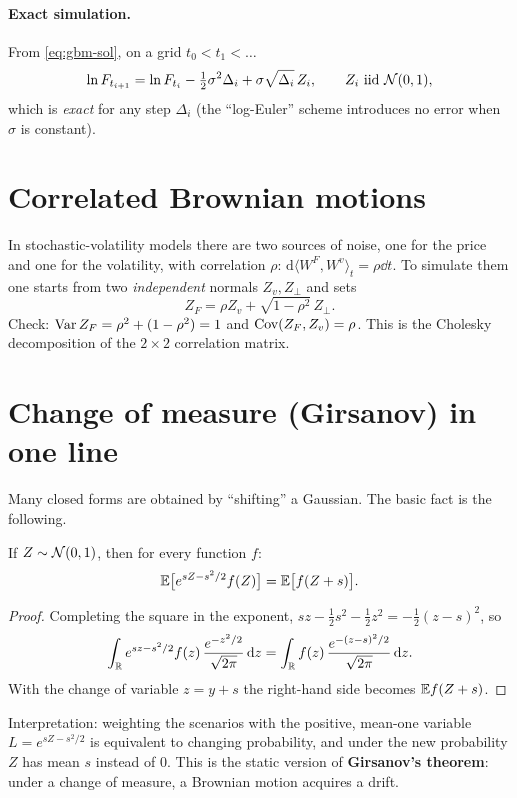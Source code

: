 \paragraph{Exact simulation.} From \eqref{eq:gbm-sol}, on a grid $t_0<t_1<\dots$
\begin{equation}\label{eq:log-euler}
\ln F_{t_{i+1}}=\ln F_{t_i}-\tfrac12\sigma^2\Delta_i+\sigma\sqrt{\Delta_i}\,Z_i,\qquad Z_i\ \text{iid }\N(0,1),
\end{equation}
which is \emph{exact} for any step $\Delta_i$ (the ``log-Euler'' scheme introduces no error when $\sigma$ is
constant).

\section{Correlated Brownian motions}
In stochastic-volatility models there are two sources of noise, one for the price and one for the volatility, with
correlation $\rho$: $\mathrm{d}\langle W^F,W^v\rangle_t=\rho\dd t$. To simulate them one starts from two
\emph{independent} normals $Z_v,Z_\perp$ and sets
\begin{equation}\label{eq:cholesky}
Z_F=\rho Z_v+\sqrt{1-\rho^2}\,Z_\perp .
\end{equation}
Check: $\operatorname{Var} Z_F=\rho^2+(1-\rho^2)=1$ and $\operatorname{Cov}(Z_F,Z_v)=\rho$. This is the Cholesky decomposition of the $2\times2$
correlation matrix.

\section{Change of measure (Girsanov) in one line}
Many closed forms are obtained by ``shifting'' a Gaussian. The basic fact is the following.

\begin{proposizione}\label{prop:tilt}
If $Z\sim\mathcal{N}(0,1)$, then for every function $f$:
\begin{equation}\label{eq:tilt}
\mathbb{E}\big[e^{sZ-s^2/2}f(Z)\big]=\mathbb{E}\big[f(Z+s)\big].
\end{equation}
\end{proposizione}

\begin{proof}
Completing the square in the exponent, $sz-\tfrac12s^2-\tfrac12z^2=-\tfrac12(z-s)^2$, so
\[
\int_{\mathbb{R}} e^{sz-s^2/2}f(z)\,\frac{e^{-z^2/2}}{\sqrt{2\pi}}\mathop{}\!\mathrm{d} z
=\int_{\mathbb{R}} f(z)\,\frac{e^{-(z-s)^2/2}}{\sqrt{2\pi}}\mathop{}\!\mathrm{d} z .
\]
With the change of variable $z=y+s$ the right-hand side becomes $\mathbb{E} f(Z+s)$.
\end{proof}
Interpretation: weighting the scenarios with the positive, mean-one variable $L=e^{sZ-s^2/2}$ is equivalent to
changing probability, and under the new probability $Z$ has mean $s$ instead of $0$. This is the static version of
\textbf{Girsanov's theorem}: under a change of measure, a Brownian motion acquires a drift.

